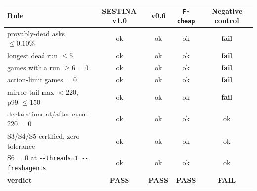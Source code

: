 \begin{tabular}{lcccc}
\toprule
Rule & SESTINA v1.0 & v0.6 & \texttt{F-cheap} & Negative control \\
\midrule
provably-dead asks $\le 0.10\%$ & ok & ok & ok & \textbf{fail} \\
longest dead run $\le 5$ & ok & ok & ok & \textbf{fail} \\
games with a run $\ge 6$ = 0 & ok & ok & ok & \textbf{fail} \\
action-limit games = 0 & ok & ok & ok & \textbf{fail} \\
mirror tail max $< 220$, p99 $\le 150$ & ok & ok & ok & \textbf{fail} \\
declarations at/after event 220 = 0 & ok & ok & ok & ok \\
S3/S4/S5 certified, zero tolerance & ok & ok & ok & ok \\
S6 = 0 at \texttt{-{}-threads=1 -{}-freshagents} & ok & ok & ok & ok \\
\midrule
\textbf{verdict} & \textbf{PASS} & \textbf{PASS} & \textbf{PASS} & \textbf{FAIL} \\
\bottomrule
\end{tabular}
